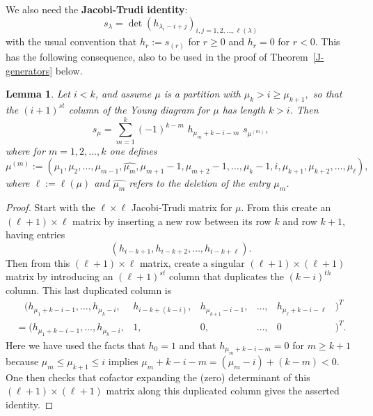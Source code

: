 \documentclass[12pt,dvips]{amsart}
\theoremstyle{plain}
\newtheorem{lemma}[theorem]{Lemma}
\theoremstyle{definition}
\theoremstyle{remark}
\numberwithin{equation}{section}
\begin{document}
We also need the {\bf Jacobi-Trudi identity}: 
\begin{equation}
\label{Jacobi-Trudi}
s_\lambda = \det( h_{\lambda_i - i + j}  )_{i,j=1,2,\ldots,\ell(\lambda)}
\end{equation}
with the usual convention that $h_r := s_{(r)}$ for $r \geq 0$ and
$h_r = 0$ for $r < 0$.  This has the following consequence, also
to be used in the proof of Theorem~\ref{J-generators} below.

\begin{lemma}
\label{Woo-2nd-lemma}
Let $i < k$, and assume $\mu$ is a partition with
$
\mu_k > i \geq \mu_{k+1},
$
so that the $(i+1)^{st}$ column of the Young diagram for $\mu$ has length $k > i$.
Then
$$
s_\mu = \sum_{m=1}^k (-1)^{k-m} \,\, h_{\mu_m+k-i-m} \,\, s_{\mu^{(m)}},
$$
where for $m=1,2,\ldots,k$ one defines
$$
\mu^{(m)}:=(\mu_1,\mu_2,\ldots,\mu_{m-1},\widehat{\mu_m}, \mu_{m+1}-1,\mu_{m+2}-1,
               \ldots,\mu_k-1,i,\mu_{k+1},\mu_{k+2},\ldots,\mu_{\ell}),
$$
where $\ell:=\ell(\mu)$ and $\widehat{\mu_m}$ refers to the deletion of
the entry $\mu_m$.
%
\end{lemma}
\begin{proof}
Start with the $\ell \times \ell$
Jacobi-Trudi matrix for $\mu$.  From this create an $(\ell+1) \times \ell$ matrix by inserting a 
new row between its row $k$ and row $k+1$, having entries 
$$
(h_{i-k+1},h_{i-k+2},\ldots,h_{i-k+\ell}).
$$  
Then from this $(\ell+1) \times \ell$ matrix, create a singular $(\ell+1) \times (\ell+1)$ matrix 
by introducing an $(\ell+1)^{st}$ column that
duplicates the $(k-i)^{th}$ column.  This last duplicated column is
$$
\begin{array}{lccrll}
\ \ \ \ (h_{\mu_1+k-i-1},\ldots,h_{\mu_k-i},
   &h_{i-k + (k-i)},&h_{\mu_{k+1}-i-1},&\ldots, &h_{\mu_{\ell}+k-i-\ell}&)^T \\
= (h_{\mu_1+k-i-1},\ldots,h_{\mu_k-i},
   &1,            &0,              &\ldots,&0&)^T.
\end{array}
$$
Here we have used the facts that $h_0=1$ and that $h_{\mu_m+k-i-m}=0$ 
for $m \geq k+1$ because $\mu_m \leq \mu_{k+1} \leq i$ implies 
$\mu_m+k-i-m=(\mu_m-i)+(k-m)<0$.
One then checks that cofactor expanding the (zero) determinant of this 
$(\ell+1) \times (\ell+1)$ matrix along this duplicated column gives the asserted identity.
\end{proof}
\end{document}
